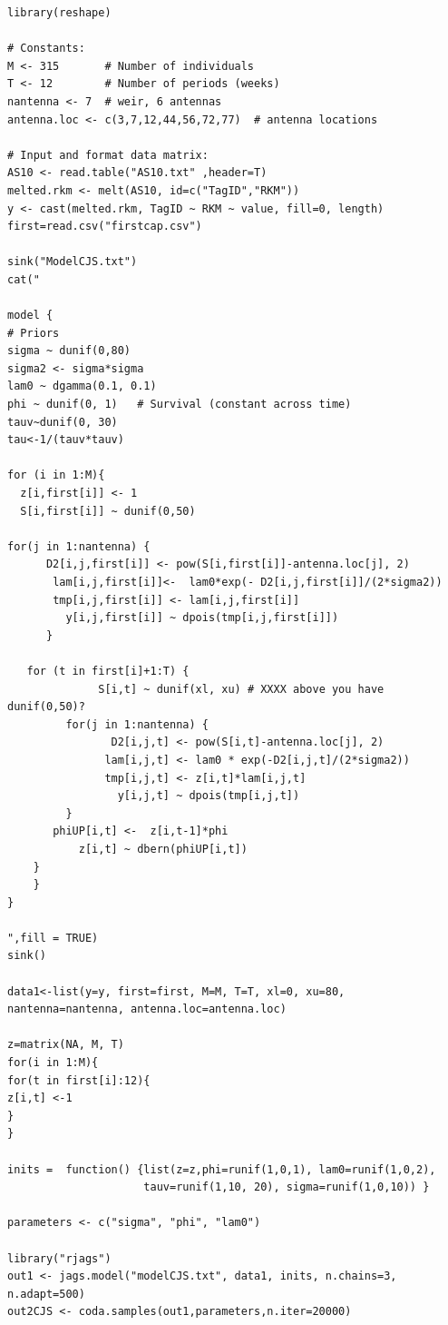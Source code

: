 {\small
\begin{verbatim}
library(reshape)

# Constants:
M <- 315       # Number of individuals
T <- 12        # Number of periods (weeks)
nantenna <- 7  # weir, 6 antennas
antenna.loc <- c(3,7,12,44,56,72,77)  # antenna locations

# Input and format data matrix:
AS10 <- read.table("AS10.txt" ,header=T)
melted.rkm <- melt(AS10, id=c("TagID","RKM"))
y <- cast(melted.rkm, TagID ~ RKM ~ value, fill=0, length)
first=read.csv("firstcap.csv")

sink("ModelCJS.txt")
cat("

model {
# Priors
sigma ~ dunif(0,80)
sigma2 <- sigma*sigma
lam0 ~ dgamma(0.1, 0.1)
phi ~ dunif(0, 1)   # Survival (constant across time)
tauv~dunif(0, 30)
tau<-1/(tauv*tauv)

for (i in 1:M){
  z[i,first[i]] <- 1
  S[i,first[i]] ~ dunif(0,50)

for(j in 1:nantenna) {
	  D2[i,j,first[i]] <- pow(S[i,first[i]]-antenna.loc[j], 2)
       lam[i,j,first[i]]<-  lam0*exp(- D2[i,j,first[i]]/(2*sigma2))
       tmp[i,j,first[i]] <- lam[i,j,first[i]]
         y[i,j,first[i]] ~ dpois(tmp[i,j,first[i]])
      }

   for (t in first[i]+1:T) {
	          S[i,t] ~ dunif(xl, xu) # XXXX above you have dunif(0,50)?
         for(j in 1:nantenna) {
		        D2[i,j,t] <- pow(S[i,t]-antenna.loc[j], 2)
               lam[i,j,t] <- lam0 * exp(-D2[i,j,t]/(2*sigma2))
	           tmp[i,j,t] <- z[i,t]*lam[i,j,t]
		         y[i,j,t] ~ dpois(tmp[i,j,t])
		 }
 	   phiUP[i,t] <-  z[i,t-1]*phi
	       z[i,t] ~ dbern(phiUP[i,t])
	}
	}
}

",fill = TRUE)
sink()

data1<-list(y=y, first=first, M=M, T=T, xl=0, xu=80, nantenna=nantenna, antenna.loc=antenna.loc)

z=matrix(NA, M, T)
for(i in 1:M){
for(t in first[i]:12){
z[i,t] <-1
}
}

inits =  function() {list(z=z,phi=runif(1,0,1), lam0=runif(1,0,2),
                     tauv=runif(1,10, 20), sigma=runif(1,0,10)) }

parameters <- c("sigma", "phi", "lam0")

library("rjags")
out1 <- jags.model("modelCJS.txt", data1, inits, n.chains=3, n.adapt=500)
out2CJS <- coda.samples(out1,parameters,n.iter=20000)
\end{verbatim}
}

